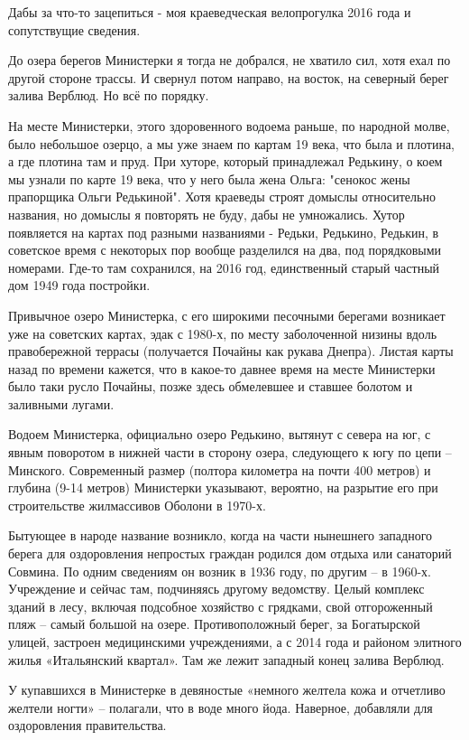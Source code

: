 Дабы за что-то зацепиться - моя краеведческая велопрогулка 2016 года и сопутствущие сведения. 

До озера берегов Министерки я тогда не добрался, не хватило сил, хотя ехал по другой стороне трассы. И свернул потом направо, на восток, на северный берег залива Верблюд. Но всё по порядку.

На месте Министерки, этого здоровенного водоема раньше, по народной молве, было небольшое озерцо, а мы уже знаем по картам 19 века, что была и плотина, а где плотина там и пруд. При хуторе, который принадлежал Редькину, о коем мы узнали по карте 19 века, что у него была жена Ольга: "сенокос жены прапорщика Ольги Редькиной". Хотя краеведы строят домыслы относительно названия, но домыслы я повторять не буду, дабы не умножались. Хутор появляется на картах под разными названиями - Редьки, Редькино, Редькин, в советское время с некоторых пор вообще разделился на два, под порядковыми номерами. Где-то там сохранился, на 2016 год, единственный старый частный дом 1949 года постройки. 

Привычное озеро Министерка, с его широкими песочными берегами возникает уже на советских картах, эдак с 1980-х, по месту заболоченной низины вдоль правобережной террасы (получается Почайны как рукава Днепра). Листая карты назад по времени кажется, что в какое-то давнее время на месте Министерки было таки русло Почайны, позже здесь обмелевшее и ставшее болотом и заливными лугами.

Водоем Министерка, официально озеро Редькино, вытянут с севера на юг, с явным поворотом в нижней части в сторону озера, следующего к югу по цепи – Минского. Современный размер (полтора километра на почти 400 метров) и глубина (9-14 метров) Министерки указывают, вероятно, на разрытие его при строительстве жилмассивов Оболони в 1970-х.

Бытующее в народе название возникло, когда на части нынешнего западного берега для оздоровления непростых граждан родился дом отдыха или санаторий Совмина. По одним сведениям он возник в 1936 году, по другим – в 1960-х. Учреждение и сейчас там, подчиняясь другому ведомству. Целый комплекс зданий в лесу, включая подсобное хозяйство с грядками, свой отгороженный пляж – самый большой на озере. Противоположный берег, за Богатырской улицей, застроен медицинскими учреждениями, а с 2014 года и районом элитного жилья «Итальянский квартал». Там же лежит западный конец залива Верблюд.

У купавшихся в Министерке в девяностые «немного желтела кожа и отчетливо желтели ногти» – полагали, что в воде много йода. Наверное, добавляли для оздоровления правительства. 

